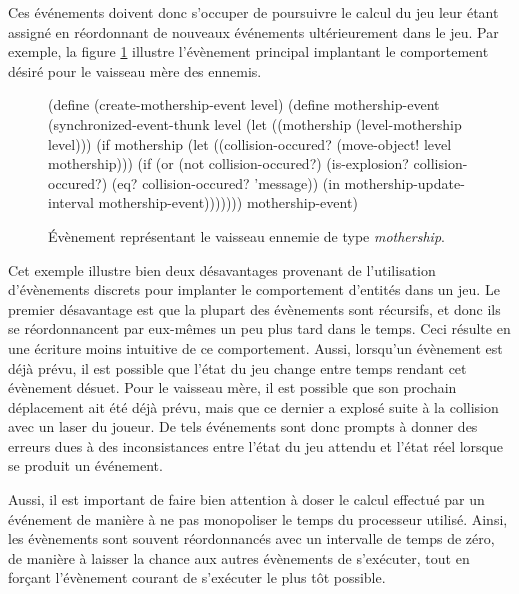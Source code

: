 \documentclass[12pt,twoside,letterpaper,francais]{book}
\begin{document}
Ces événements doivent donc s'occuper de poursuivre le calcul du jeu
leur étant assigné en réordonnant de nouveaux événements
ultérieurement dans le jeu. Par exemple, la figure \ref{Exp:mother-ev}
illustre l'évènement principal implantant le comportement désiré pour
le vaisseau mère des ennemis.

\begin{figure}[htb!]
  \begin{schemecode}
(define (create-mothership-event level)
 (define mothership-event
   (synchronized-event-thunk level
     (let ((mothership (level-mothership level)))
       (if mothership
           (let ((collision-occured? (move-object! level mothership)))
             (if (or (not collision-occured?)
                     (is-explosion? collision-occured?)
                     (eq? collision-occured? 'message))
                 (in mothership-update-interval mothership-event)))))))
  mothership-event)
  \end{schemecode}
  \caption{Évènement représentant le vaisseau ennemie de type
    \textit{mothership}.}
  \label{Exp:mother-ev}
\end{figure}

Cet exemple illustre bien deux désavantages provenant de l'utilisation
d'évènements discrets pour implanter le comportement d'entités dans un
jeu. Le premier désavantage est que la plupart des évènements sont
récursifs, et donc ils se réordonnancent par eux-mêmes un peu plus
tard dans le temps. Ceci résulte en une écriture moins intuitive de ce
comportement. Aussi, lorsqu'un évènement est déjà prévu, il est
possible que l'état du jeu change entre temps rendant cet évènement
désuet. Pour le vaisseau mère, il est possible que son prochain
déplacement ait été déjà prévu, mais que ce dernier a explosé suite à
la collision avec un laser du joueur. De tels événements sont donc
prompts à donner des erreurs dues à des inconsistances entre l'état du
jeu attendu et l'état réel lorsque se produit un événement.

Aussi, il est important de faire bien attention à doser le calcul
effectué par un événement de manière à ne pas monopoliser le temps du
processeur utilisé. Ainsi, les évènements sont souvent réordonnancés
avec un intervalle de temps de zéro, de manière à laisser la chance
aux autres évènements de s'exécuter, tout en forçant l'évènement
courant de s'exécuter le plus tôt possible.
\end{document}
